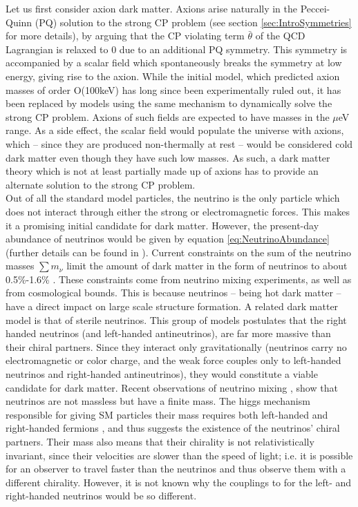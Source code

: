 Let us first consider axion dark matter. Axions arise naturally in the Peccei-Quinn (PQ) solution to the strong CP problem\cite{PQ_axion, Weinberg} (see section \ref{sec:IntroSymmetries} for more details), by arguing that the CP violating term $\bar{\theta}$ of the QCD Lagrangian is relaxed to 0 due to an additional PQ symmetry. This symmetry is accompanied by a scalar field which spontaneously breaks the symmetry at low energy, giving rise to the axion. While the initial model, which predicted axion masses of order O(100keV) has long since been experimentally ruled out, it has been replaced by models using the same mechanism to dynamically solve the strong CP problem. Axions of such fields are expected to have masses in the $\mu$eV range. As a side effect, the scalar field would populate the universe with axions, which -- since they are produced non-thermally at rest\cite{cookbook} -- would be considered cold dark matter even though they have such low masses. As such, a dark matter theory which is not at least partially made up of axions has to provide an alternate solution to the strong CP problem. \\

Out of all the standard model particles, the neutrino is the only particle which does not interact through either the strong or electromagnetic forces. This makes it a promising initial candidate for dark matter. However, the present-day abundance of neutrinos would be given by equation \ref{eq:NeutrinoAbundance} (further details can be found in \cite{BAER20151}). Current constraints on the sum of the neutrino masses $\sum m_\nu$ limit the amount of dark matter in the form of neutrinos to about 0.5\%-1.6\% \cite{PDG2022}. These constraints come from neutrino mixing experiments, as well as from cosmological bounds. This is because neutrinos -- being hot dark matter -- have a direct impact on large scale structure formation. A related dark matter model is that of sterile neutrinos. This group of models postulates that the right handed neutrinos (and left-handed antineutrinos), are far more massive than their chiral partners. Since they interact only gravitationally (neutrinos carry no electromagnetic or color charge, and the weak force couples only to left-handed neutrinos and right-handed antineutrinos), they would constitute a viable candidate for dark matter\cite{}. Recent observations of neutrino mixing \cite{}, show that neutrinos are not massless but have a finite mass. The higgs mechanism responsible for giving SM particles their mass requires both left-handed and right-handed fermions \cite{}, and thus suggests the existence of the neutrinos' chiral partners. Their mass also means that their chirality is not relativistically invariant, since their velocities are slower than the speed of light; i.e. it is possible for an observer to travel faster than the neutrinos and thus observe them with a different chirality. However, it is not known why the couplings to for the left- and right-handed neutrinos would be so different. \\

